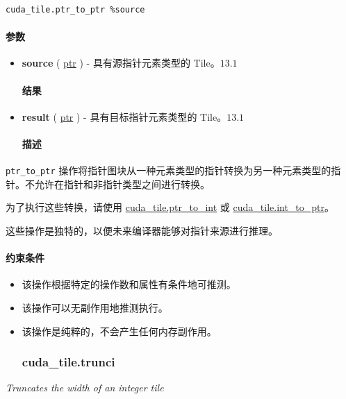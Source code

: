 \documentclass{article}
\begin{document}
\begin{lstlisting}
cuda_tile.ptr_to_ptr %source
\end{lstlisting}

\paragraph{参数}

\begin{itemize}
\item \textbf{source} ( \href{https://docs.nvidia.com/cuda/tile-ir/latest/sections/types.html#type-ptr}{ptr} ) - 具有源指针元素类型的 Tile。$\boxed{13.1}$


\paragraph{结果}

\item \textbf{result} ( \href{https://docs.nvidia.com/cuda/tile-ir/latest/sections/types.html#type-ptr}{ptr} ) - 具有目标指针元素类型的 Tile。$\boxed{13.1}$


\paragraph{描述}

\end{itemize}
\texttt{ptr\_to\_ptr} 操作将指针图块从一种元素类型的指针转换为另一种元素类型的指针。不允许在指针和非指针类型之间进行转换。


为了执行这些转换，请使用 \href{https://docs.nvidia.com/cuda/tile-ir/latest/sections/operations.html#op-cuda-tile-ptr-to-int}{cuda\_tile.ptr\_to\_int} 或 \href{https://docs.nvidia.com/cuda/tile-ir/latest/sections/operations.html#op-cuda-tile-int-to-ptr}{cuda\_tile.int\_to\_ptr}。

这些操作是独特的，以便未来编译器能够对指针来源进行推理。



\paragraph{约束条件}

\begin{itemize}
\item 该操作根据特定的操作数和属性有条件地可推测。
\item 该操作可以无副作用地推测执行。
\item 该操作是纯粹的，不会产生任何内存副作用。


\subsubsection{cuda\_tile.trunci}

\end{itemize}
\textit{Truncates the width of an integer tile}
\end{document}
